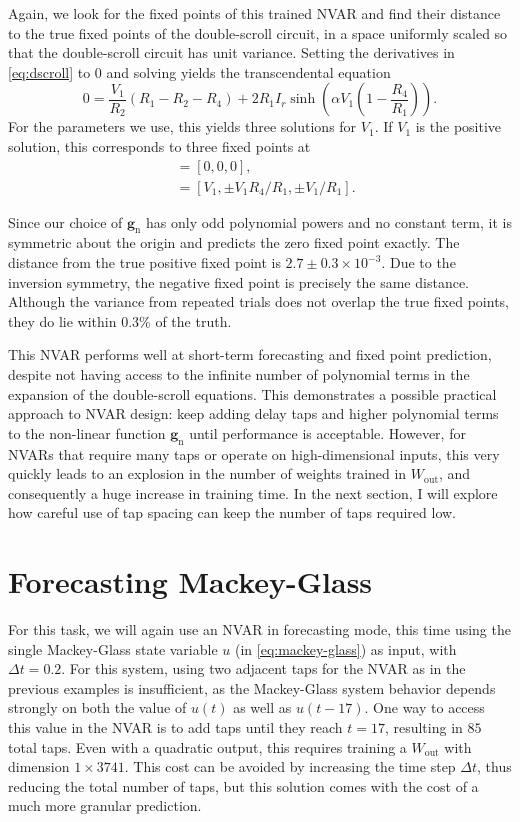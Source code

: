 Again, we look for the fixed points of this trained NVAR and find
their distance to the true fixed points of the double-scroll circuit,
in a space uniformly scaled so that the double-scroll circuit has unit
variance. Setting the derivatives in \cref{eq:dscroll} to $0$
and solving yields the transcendental equation
\begin{equation}
  0 = \frac{V_1}{R_2}(R_1 - R_2 - R_4) + 2 R_1 I_r \sinh\left(\alpha V_1 \left(1 - \frac{R_4}{R_1}\right)\right).
\end{equation}
For the parameters we use, this yields three solutions for $V_1$. If
$V_1$ is the positive solution, this corresponds to three fixed points
at
\begin{align}
  [V_1, V_2, I] &= [0, 0, 0], \\
                &= [V_1, \pm V_1 R_4 / R_1, \pm V_1 / R_1].
\end{align}

Since our choice of $\bm{g}_\text{n}$ has only odd polynomial powers
and no constant term, it is symmetric about the origin and predicts
the zero fixed point exactly. The distance from the true positive
fixed point is $2.7\pm0.3\times10^{-3}$. Due to the inversion
symmetry, the negative fixed point is precisely the same
distance. Although the variance from repeated trials does not overlap
the true fixed points, they do lie within $0.3\%$ of the truth.

This NVAR performs well at short-term forecasting and fixed point
prediction, despite not having access to the infinite number of
polynomial terms in the expansion of the double-scroll equations. This
demonstrates a possible practical approach to NVAR design: keep adding
delay taps and higher polynomial terms to the non-linear function
$\bm{g}_\text{n}$ until performance is acceptable. However, for NVARs
that require many taps or operate on high-dimensional inputs, this
very quickly leads to an explosion in the number of weights trained in
$W_\text{out}$, and consequently a huge increase in training time. In
the next section, I will explore how careful use of tap spacing can
keep the number of taps required low.

\section{Forecasting Mackey-Glass}


For this task, we will again use an NVAR in forecasting mode, this
time using the single Mackey-Glass state variable $u$ (in
\cref{eq:mackey-glass}) as input, with $\Delta t = 0.2$. For this
system, using two adjacent taps for the NVAR as in the previous
examples is insufficient, as the Mackey-Glass system behavior depends
strongly on both the value of $u(t)$ as well as $u(t - 17)$. One way
to access this value in the NVAR is to add taps until they reach $t =
17$, resulting in $85$ total taps. Even with a quadratic output, this
requires training a $W_\text{out}$ with dimension $1 \times
3741$. This cost can be avoided by increasing the time step $\Delta
t$, thus reducing the total number of taps, but this solution comes
with the cost of a much more granular prediction.

